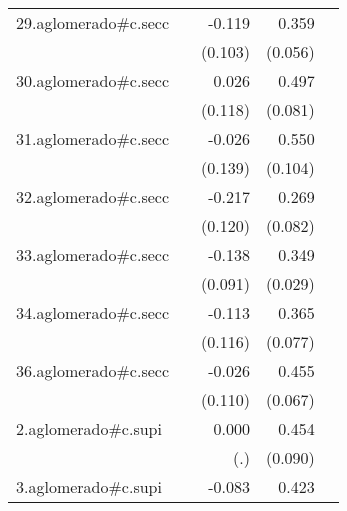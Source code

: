 {\begin{longtable}{l*{4}{D{.}{.}{-1}}}
\addlinespace
29.aglomerado#c.secc&                     &      -0.119         &       0.359\sym{***}&                     \\
            &                     &     (0.103)         &     (0.056)         &                     \\
\addlinespace
30.aglomerado#c.secc&                     &       0.026         &       0.497\sym{***}&                     \\
            &                     &     (0.118)         &     (0.081)         &                     \\
\addlinespace
31.aglomerado#c.secc&                     &      -0.026         &       0.550\sym{***}&                     \\
            &                     &     (0.139)         &     (0.104)         &                     \\
\addlinespace
32.aglomerado#c.secc&                     &      -0.217         &       0.269\sym{**} &                     \\
            &                     &     (0.120)         &     (0.082)         &                     \\
\addlinespace
33.aglomerado#c.secc&                     &      -0.138         &       0.349\sym{***}&                     \\
            &                     &     (0.091)         &     (0.029)         &                     \\
\addlinespace
34.aglomerado#c.secc&                     &      -0.113         &       0.365\sym{***}&                     \\
            &                     &     (0.116)         &     (0.077)         &                     \\
\addlinespace
36.aglomerado#c.secc&                     &      -0.026         &       0.455\sym{***}&                     \\
            &                     &     (0.110)         &     (0.067)         &                     \\
\addlinespace
2.aglomerado#c.supi&                     &       0.000         &       0.454\sym{***}&                     \\
            &                     &         (.)         &     (0.090)         &                     \\
\addlinespace
3.aglomerado#c.supi&                     &      -0.083         &       0.423\sym{***}&                     \\

\end{longtable}}
